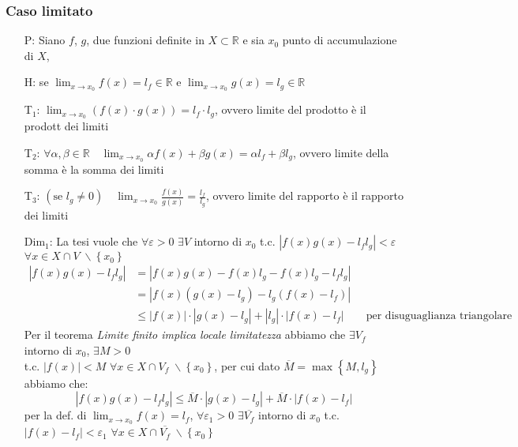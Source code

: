 \documentclass[a4paper]{article}
\begin{document}
\subsubsection*{Caso limitato}
\begin{itemize}
	\item[P:] Siano \(f\), \(g\), due funzioni definite in \(X \subset \mathbb{R}\) e sia \(x_0\) punto di accumulazione di \(X\),
	\item[H:] se \(\displaystyle \lim_{x \to x_0} f(x) = l_f \in \mathbb{R}\) e \(\displaystyle \lim_{x \to x_0} g(x) = l_g \in \mathbb{R}\)
	\item[T\(_1\):] \(\displaystyle \lim_{x \to x_0} \left( f(x) \cdot g(x) \right) = l_f \cdot l_g\), ovvero limite del prodotto è il prodott dei limiti
	\item[T\(_2\):] \(\forall \alpha, \beta \in \mathbb{R} \quad \displaystyle \lim_{x \to x_0} \alpha f(x) + \beta g(x) = \alpha l_f + \beta l_g\), ovvero limite della somma è la somma dei limiti
	\item[T\(_3\):] \(\left( \text{se } l_g \neq 0 \right) \quad \displaystyle \lim_{x \to x_0} \frac{f(x)}{g(x)} = \frac{l_f}{l_g}\), ovvero limite del rapporto è il rapporto dei limiti
	\item[Dim\(_1\):] La tesi vuole che \(\forall \varepsilon > 0\) \(\exists V\) intorno di \(x_0\) t.c. \(\left| f(x)g(x) - l_f l_g \right| < \varepsilon\) \(\forall x \in X \cap V \; \backslash \left\{ x_0 \right\}\)
	\begin{align*}
		\left| f(x) g(x) - l_f l_g \right| &= \left| f(x) g(x) -f(x) l_g - f(x) l_g - l_f l_g\right| \\
		&= \left| f(x) \left( g(x) - l_g \right) - l_g \left( f(x) - l_f \right) \right| \\
		& \leq \left| f(x) \right| \cdot \left| g(x) - l_g \right| + \left| l_g \right| \cdot \left| f(x) - l_f \right| \qquad \text{per disuguaglianza triangolare}
	\end{align*}
	Per il teorema \textit{Limite finito implica locale limitatezza} abbiamo che \(\exists V_f\) intorno di \(x_0\), \(\exists M > 0\) \\ 
	t.c. \(\left| f(x) \right| < M\) \(\forall x \in X \cap V_f \; \backslash \left\{ x_0 \right\}\), per cui dato \(\overline{M} = \max \left\{ M, l_g \right\}\) abbiamo che:
	\[\left| f(x) g(x) - l_f l_g \right| \leq \overline{M} \cdot \left| g(x) - l_g \right| + \overline{M} \cdot \left| f(x) - l_f \right|\]
	per la def. di \(\displaystyle \lim_{x \to x_0} f(x) = l_f\), \(\forall \varepsilon_1 > 0\) \(\exists \overline{V_f}\) intorno di \(x_0\) t.c. \(\left| f(x) - l_f \right| < \varepsilon_1\) \(\forall x \in X \cap \overline{V_f} \; \backslash \left\{ x_0 \right\}\) \\

\end{itemize}
\end{document}

